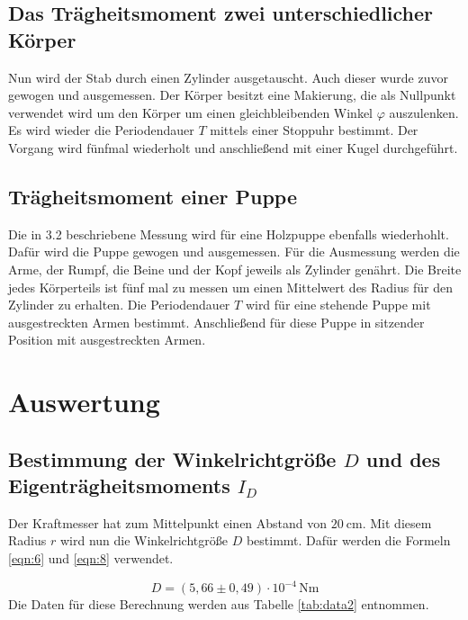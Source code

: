 \documentclass[
  bibliography=totoc,     %
  captions=tableheading,  %
  titlepage=firstiscover, %
]{scrartcl}
\begin{document}
   \subsection{Das Trägheitsmoment zwei unterschiedlicher Körper}

      Nun wird der Stab durch einen Zylinder ausgetauscht.
      Auch dieser wurde zuvor gewogen und ausgemessen.
      Der Körper besitzt eine Makierung, die als Nullpunkt verwendet wird
      um den Körper um einen
      gleichbleibenden Winkel $\varphi$ auszulenken.
      Es wird wieder die Periodendauer $T$ mittels einer Stoppuhr bestimmt.
      Der Vorgang wird fünfmal wiederholt und
      anschließend mit einer Kugel durchgeführt.

   \subsection{Trägheitsmoment einer Puppe}

      Die in 3.2 beschriebene Messung wird für eine Holzpuppe ebenfalls wiederhohlt.
      Dafür wird die Puppe gewogen und ausgemessen.
      Für die Ausmessung werden die Arme, der Rumpf, die Beine und der Kopf
      jeweils als Zylinder genährt.
      Die Breite jedes Körperteils ist fünf mal zu messen um einen Mittelwert
      des Radius für den Zylinder zu erhalten.
      Die Periodendauer $T$ wird für eine stehende Puppe mit ausgestreckten Armen bestimmt.
      Anschließend für diese Puppe in sitzender Position mit ausgestreckten Armen.

    \section{Auswertung}


   \subsection{Bestimmung der Winkelrichtgröße $D$ und des Eigenträgheitsmoments $I_D$}

   Der Kraftmesser hat zum Mittelpunkt einen Abstand von $\SI{20}{\centi\meter}$.
   Mit diesem Radius $r$ wird nun die Winkelrichtgröße $D$ bestimmt.
   Dafür werden die Formeln \ref{eqn:6} und \ref{eqn:8} verwendet.

   \begin{equation}
     D = (5{,}66 \pm 0{,}49) \cdot 10^{-4}\, \mathrm{Nm}
   \end{equation}
   Die Daten für diese Berechnung werden aus Tabelle \ref{tab:data2} entnommen.
\end{document}
